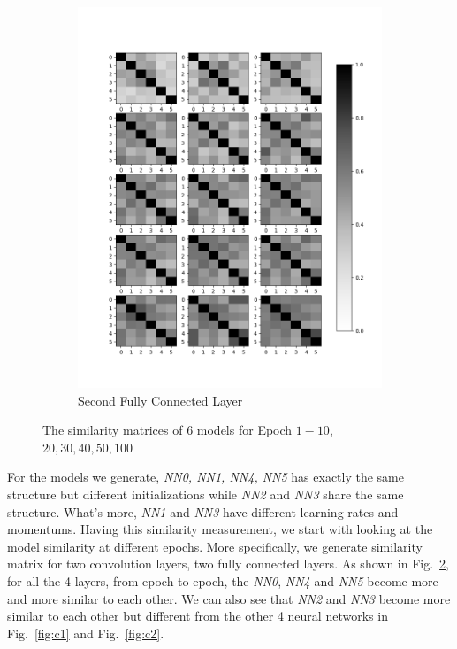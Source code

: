 \documentclass[11pt, twocolumn]{article}
\begin{document}
\begin{figure}
\begin{subfigure}[b]{0.475\textwidth}
		\includegraphics[width=\textwidth]{figs/output.png}
		\caption[]%
		{{\small Second Fully Connected Layer}}    
		\label{fig:output}
	\end{subfigure}
	\caption[]
	{\small The similarity matrices of 6 models for Epoch $1-10$,$20,30,40,50,100$} 
	\label{fig:model-comparison}
\end{figure}

For the models we generate, \emph{NN0, NN1, NN4, NN5} has exactly the same structure but different initializations while \emph{NN2} and \emph{NN3} share the same structure. What's more, \emph{NN1} and \emph{NN3} have different learning rates and momentums. Having this similarity measurement, we start with looking at the model similarity at different epochs. More specifically, we generate similarity matrix for two convolution layers, two fully connected layers. As shown in Fig.~\ref{fig:model-comparison}, for all the 4 layers, from epoch to epoch, the \emph{NN0}, \emph{NN4} and \emph{NN5} become more and more similar to each other. We can also see that  \emph{NN2} and \emph{NN3} become more similar to each other but different from the other 4 neural networks in Fig.~\ref{fig:c1} and Fig.~\ref{fig:c2}.
\end{document}
